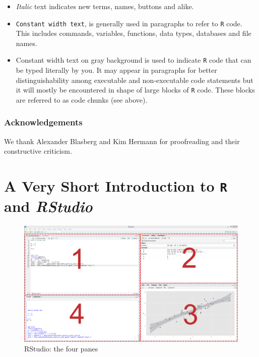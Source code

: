 \documentclass[]{book}
\theoremstyle{definition}
\theoremstyle{definition}
\theoremstyle{definition}
\theoremstyle{remark}
\begin{document}
\begin{itemize}
\item
  \emph{Italic} text indicates new terms, names, buttons and alike.
\item
  \texttt{Constant width text}, is generally used in paragraphs to refer
  to \texttt{R} code. This includes commands, variables, functions, data
  types, databases and file names.
\item
  Constant width text on gray background is used to indicate \texttt{R}
  code that can be typed literally by you. It may appear in paragraphs
  for better distinguishability among executable and non-executable code
  statements but it will mostly be encountered in shape of large blocks
  of \texttt{R} code. These blocks are referred to as code chunks (see
  above).
\end{itemize}

\subsubsection*{Acknowledgements}\label{acknowledgements}

We thank Alexander Blasberg and Kim Hermann for proofreading and their
constructive criticism.

\section{\texorpdfstring{A Very Short Introduction to \texttt{R} and
\emph{RStudio}}{A Very Short Introduction to  and RStudio}}\label{a-very-short-introduction-to-and-rstudio}

\begin{figure}[h]

{\centering \includegraphics[width=1\linewidth]{images/rstudio} 

}

\caption{RStudio: the four panes}\label{fig:unnamed-chunk-7}
\end{figure}
\end{document}
